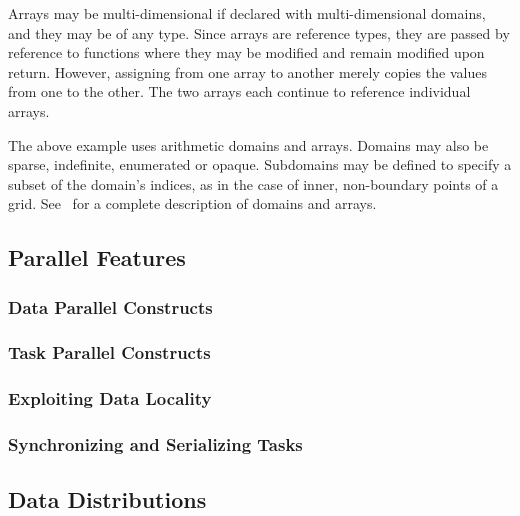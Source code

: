 Arrays may be multi-dimensional if declared with multi-dimensional domains,
and they may be of any type.  
Since arrays are reference types, they are passed by reference to functions
where they may be modified and remain modified upon return.  However, assigning
from one array to another merely copies the values from one to the other.  The
two arrays each continue to reference individual arrays. 

The above example uses arithmetic domains and arrays.  Domains may
also be sparse, indefinite, enumerated or opaque.  Subdomains may be
defined to specify a subset of the domain's indices, as in the case of
inner, non-boundary points of a grid.  See~ for
a complete description of domains and arrays.
 
\subsection{Parallel Features}
\label{Parallel_Features}


\subsubsection{Data Parallel Constructs}
\label{Data_Parallel_Constructs}


\subsubsection{Task Parallel Constructs}
\label{Task_Parallel_Constructs}


\subsubsection{Exploiting Data Locality}
\label{Exploiting_Data_Locality}


\subsubsection{Synchronizing and Serializing Tasks}
\label{Synchronizing_and_Serializing_Tasks}


\subsection{Data Distributions}
\label{Data_Distributions}

